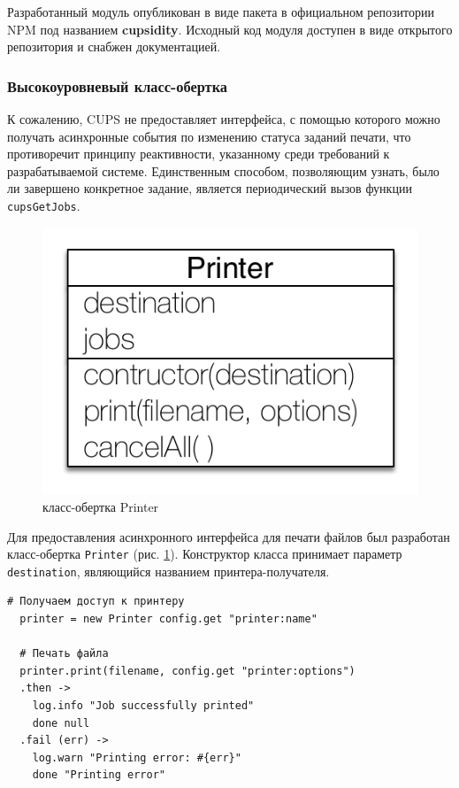 \documentclass[a4paper,14pt,href,draft]{article}
\begin{document}
Разработанный модуль опубликован в виде пакета в официальном репозитории NPM под названием \textbf{cupsidity}. Исходный
код модуля доступен в виде открытого репозитория и снабжен документацией\cite{Cupsidity}.

\subsubsection{Высокоуровневый класс-обертка}
К сожалению, CUPS не предоставляет интерфейса, с помощью которого можно получать асинхронные события по изменению
статуса заданий печати, что противоречит принципу реактивности, указанному среди требований к разрабатываемой системе.
Единственным способом, позволяющим узнать, было ли завершено конкретное задание, является периодический вызов функции
\texttt{cupsGetJobs}.

\begin{figure}[htbp]
\begin{center}
  \includegraphics[scale=0.8]{printer-class.pdf}
    \caption{класс-обертка Printer}
    \label{fig:PrinterClass}
\end{center}
\end{figure}

Для предоставления асинхронного интерфейса для печати файлов был разработан класс-обертка \texttt{Printer} (рис.
\ref{fig:PrinterClass}). Конструктор класса принимает параметр \texttt{destination}, являющийся названием
принтера-получателя.


\begin{lstlisting}[caption=Печать файла с помощью класса \texttt{Printer}, label=lst:deferred]
  # Получаем доступ к принтеру
  printer = new Printer config.get "printer:name"

  # Печать файла
  printer.print(filename, config.get "printer:options")
  .then ->
    log.info "Job successfully printed"
    done null
  .fail (err) ->
    log.warn "Printing error: #{err}"
    done "Printing error"
\end{lstlisting}
\end{document}
